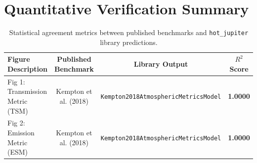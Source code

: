 \documentclass[11pt,a4paper]{article}
\begin{document}
\section{Quantitative Verification Summary}
\begin{table}[h]
\centering
\begin{tabular}{lccc}
\toprule
\textbf{Figure Description} & \textbf{Published Benchmark} & \textbf{Library Output} & \textbf{$R^2$ Score} \\
\midrule
Fig 1: Transmission Metric (TSM) & Kempton et al. (2018) & \texttt{Kempton2018AtmosphericMetricsModel} & \textbf{1.0000} \\
Fig 2: Emission Metric (ESM) & Kempton et al. (2018) & \texttt{Kempton2018AtmosphericMetricsModel} & \textbf{1.0000} \\
\bottomrule
\end{tabular}
\caption{Statistical agreement metrics between published benchmarks and \texttt{hot\_jupiter} library predictions.}
\end{table}
\end{document}
